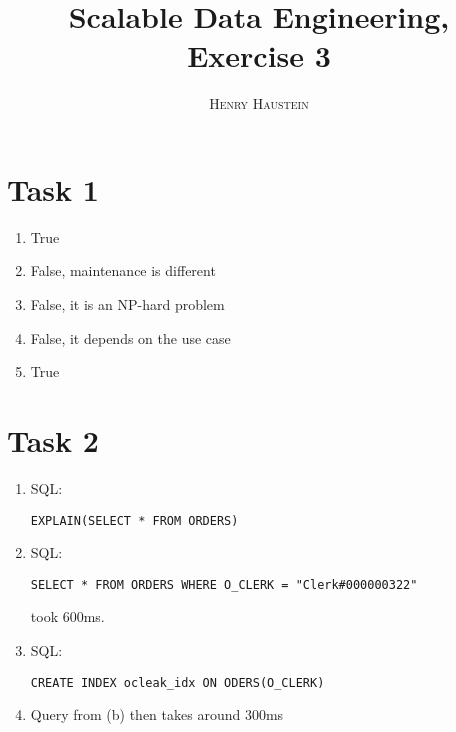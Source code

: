 \documentclass{article}
\title{\textbf{Scalable Data Engineering, Exercise 3}}
\author{\textsc{Henry Haustein}}
\date{}
\begin{document}
	\maketitle
	
	\section*{Task 1}
	\begin{enumerate}[label=(\alph*)]
		\item True
		\item False, maintenance is different
		\item False, it is an NP-hard problem
		\item False, it depends on the use case
		\item True
	\end{enumerate}

	\section*{Task 2}
	\begin{enumerate}[label=(\alph*)]
		\item SQL:
		\begin{lstlisting}
EXPLAIN(SELECT * FROM ORDERS)
		\end{lstlisting}
		\item SQL:
		\begin{lstlisting}
SELECT * FROM ORDERS WHERE O_CLERK = "Clerk#000000322"
		\end{lstlisting}
		took 600ms.
		\item SQL:
		\begin{lstlisting}
CREATE INDEX ocleak_idx ON ODERS(O_CLERK)
		\end{lstlisting}
		\item Query from (b) then takes around 300ms
	\end{enumerate}
\end{document}

